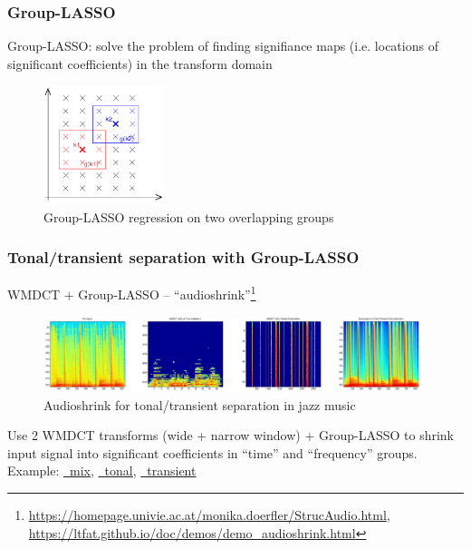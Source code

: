 \documentclass[usenames,dvipsnames]{beamer}
\begin{document}
\begin{frame}
	\frametitle{Group-LASSO}
	Group-LASSO: solve the problem of finding signifiance maps (i.e. locations of significant coefficients) in the transform domain
	\begin{figure}
		\vspace{-0.25em}
		\includegraphics[width=3.5cm]{./grouplasso.png}
		\caption{Group-LASSO regression on two overlapping groups}
		\vspace{-1em}
	\end{figure}
\end{frame}

\begin{frame}
	\frametitle{Tonal/transient separation with Group-LASSO}
	WMDCT + Group-LASSO -- ``audioshrink''\footnote{\url{https://homepage.univie.ac.at/monika.doerfler/StrucAudio.html}, \url{https://ltfat.github.io/doc/demos/demo_audioshrink.html}}
	\begin{figure}[ht]
		\vspace{-0.5em}
		\includegraphics[width=11cm]{./wmdctjazz.png}
		\caption{Audioshrink for tonal/transient separation in jazz music}
		\vspace{-0.5em}
	\end{figure}
	Use 2 WMDCT transforms (wide + narrow window) + Group-LASSO to shrink input signal into significant coefficients in ``time'' and ``frequency'' groups. Example: \href{run:./mix.wav}{\faVolumeUp \ mix}, \href{run:./harm.wav}{\faVolumeUp \ tonal}, \href{run:./perc.wav}{\faVolumeUp \ transient}
\end{frame}
\end{document}
